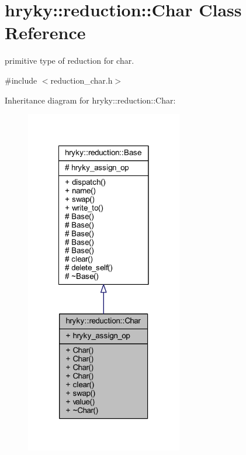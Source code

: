 \hypertarget{classhryky_1_1reduction_1_1_char}{\section{hryky\-:\-:reduction\-:\-:Char Class Reference}
\label{classhryky_1_1reduction_1_1_char}
}


primitive type of reduction for char.  




{\ttfamily \#include $<$reduction\-\_\-char.\-h$>$}



Inheritance diagram for hryky\-:\-:reduction\-:\-:Char\-:
\nopagebreak
\begin{figure}[H]
\begin{center}
\leavevmode
\includegraphics[width=194pt]{classhryky_1_1reduction_1_1_char__inherit__graph}
\end{center}
\end{figure}
